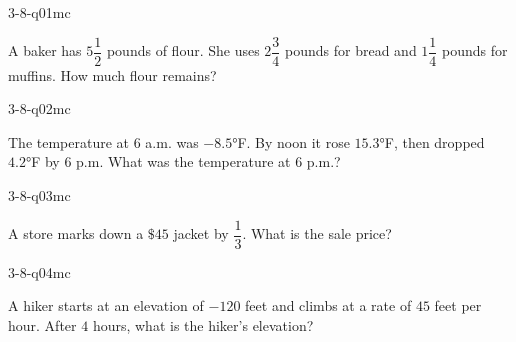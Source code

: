 

\begin{practiceQuestion}{3-8-q01}{mc}
\begin{questionText}
A baker has $5\dfrac{1}{2}$ pounds of flour. She uses $2\dfrac{3}{4}$ pounds for bread and $1\dfrac{1}{4}$ pounds for muffins. How much flour remains?
\end{questionText}
\end{practiceQuestion}

\begin{practiceQuestion}{3-8-q02}{mc}
\begin{questionText}
The temperature at $6$ a.m. was $-8.5°$F. By noon it rose $15.3°$F, then dropped $4.2°$F by $6$ p.m. What was the temperature at $6$ p.m.?
\end{questionText}
\end{practiceQuestion}

\begin{practiceQuestion}{3-8-q03}{mc}
\begin{questionText}
A store marks down a $\$45$ jacket by $\dfrac{1}{3}$. What is the sale price?
\end{questionText}
\end{practiceQuestion}

\begin{practiceQuestion}{3-8-q04}{mc}
\begin{questionText}
A hiker starts at an elevation of $-120$ feet and climbs at a rate of $45$ feet per hour. After $4$ hours, what is the hiker's elevation?
\end{questionText}
\end{practiceQuestion}

